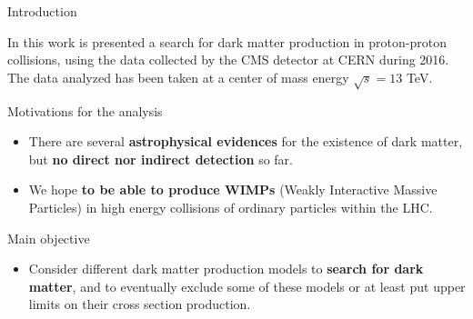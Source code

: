 \documentclass[handout,8 pt]{beamer}
\begin{document}
\begin{frame}{Introduction}


	\justifying
 	In this work is presented a search for dark matter production in proton-proton collisions, using the data collected by the CMS detector at CERN during 2016. The data analyzed has been taken at a center of mass energy $\sqrt{s} = 13$ TeV. \vfill %



	\begin{exampleblock}{} Motivations for the analysis \end{exampleblock}
	
	\begin{itemize}
	\justifying
	\item There are several \textbf{astrophysical evidences} for the existence of dark matter, but \textbf{no direct nor indirect detection} so far. \vfill
	\item We hope \textbf{to be able to produce WIMPs} (Weakly Interactive Massive Particles) in high energy collisions of ordinary particles within the LHC. \vfill %
	\end{itemize}


	\begin{exampleblock}{} Main objective \end{exampleblock}
	
	\begin{itemize}
	\justifying
	\item Consider different dark matter production models to \textbf{search for dark matter}, and to eventually exclude some of these models or at least put upper limits on their cross section production. \vfill
	\end{itemize}

\end{frame}
\end{document}
